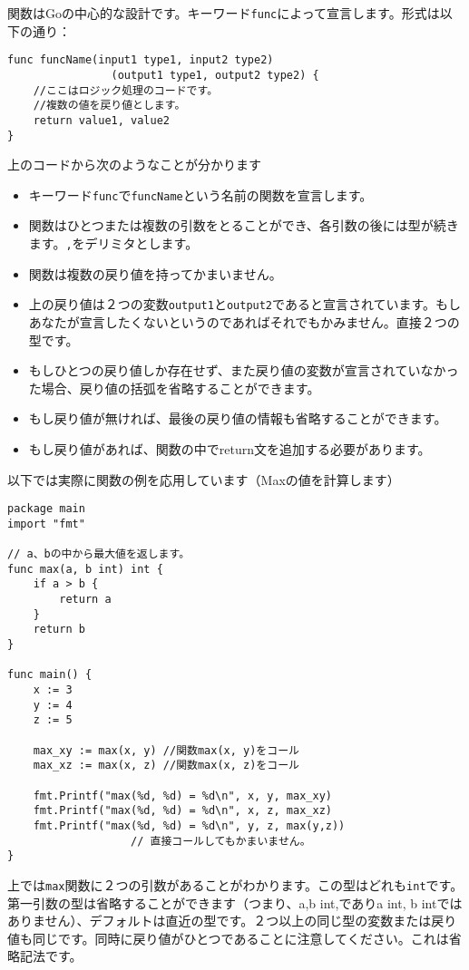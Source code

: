 関数はGoの中心的な設計です。キーワード\texttt{func}によって宣言します。形式は以下の通り：

\begin{lstlisting}[numbers=none]
func funcName(input1 type1, input2 type2)
                (output1 type1, output2 type2) {
    //ここはロジック処理のコードです。
    //複数の値を戻り値とします。
    return value1, value2
}
\end{lstlisting}

上のコードから次のようなことが分かります

\begin{itemize}
\item キーワード\texttt{func}で\texttt{funcName}という名前の関数を宣言します。
\item 関数はひとつまたは複数の引数をとることができ、各引数の後には型が続きます。\texttt{,}をデリミタとします。
\item 関数は複数の戻り値を持ってかまいません。
\item 上の戻り値は２つの変数\texttt{output1}と\texttt{output2}であると宣言されています。もしあなたが宣言したくないというのであればそれでもかみません。直接２つの型です。
\item もしひとつの戻り値しか存在せず、また戻り値の変数が宣言されていなかった場合、戻り値の括弧を省略することができます。
\item もし戻り値が無ければ、最後の戻り値の情報も省略することができます。
\item もし戻り値があれば、関数の中でreturn文を追加する必要があります。
\end{itemize}

以下では実際に関数の例を応用しています（Maxの値を計算します）

\begin{lstlisting}[numbers=none]
package main
import "fmt"

// a、bの中から最大値を返します。
func max(a, b int) int {
    if a > b {
        return a
    }
    return b
}

func main() {
    x := 3
    y := 4
    z := 5

    max_xy := max(x, y) //関数max(x, y)をコール
    max_xz := max(x, z) //関数max(x, z)をコール

    fmt.Printf("max(%d, %d) = %d\n", x, y, max_xy)
    fmt.Printf("max(%d, %d) = %d\n", x, z, max_xz)
    fmt.Printf("max(%d, %d) = %d\n", y, z, max(y,z))
                   // 直接コールしてもかまいません。
}
\end{lstlisting}

上では\texttt{max}関数に２つの引数があることがわかります。この型はどれも\texttt{int}です。第一引数の型は省略することができます（つまり、a,b int,でありa int, b intではありません）、デフォルトは直近の型です。２つ以上の同じ型の変数または戻り値も同じです。同時に戻り値がひとつであることに注意してください。これは省略記法です。

